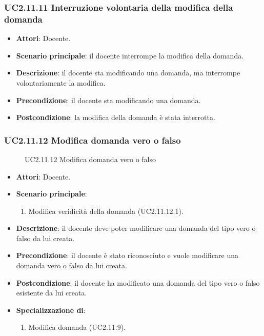 \subsubsection{UC2.11.11 Interruzione volontaria della modifica della domanda}
\begin{itemize}
\item \textbf{Attori}: Docente.
\item \textbf{Scenario principale}: il docente interrompe la modifica della domanda.
\item \textbf{Descrizione}: il docente sta modificando una domanda, ma interrompe volontariamente la modifica.
\item \textbf{Precondizione}: il docente sta modificando una domanda.
\item \textbf{Postcondizione}: la modifica della domanda è stata interrotta.
\end{itemize}
\subsubsection{UC2.11.12 Modifica domanda vero o falso}
\begin{figure}[H]
\centering
\noindent{}
\caption{UC2.11.12 Modifica domanda vero o falso}
\end{figure}
\begin{itemize}
\item \textbf{Attori}: Docente.
\item \textbf{Scenario principale}:
\begin{enumerate}
\item Modifica veridicità della domanda (UC2.11.12.1).
\end{enumerate}
\item \textbf{Descrizione}: il docente deve poter modificare una domanda del tipo vero o falso da lui creata.
\item \textbf{Precondizione}: il docente è stato riconosciuto e vuole modificare una domanda vero o falso da lui creata.
\item \textbf{Postcondizione}: il docente ha modificato una domanda del tipo vero o falso esistente da lui creata.
\item \textbf{Specializzazione di}:
\begin{enumerate}
\item Modifica domanda (UC2.11.9).
\end{enumerate}
\end{itemize}
